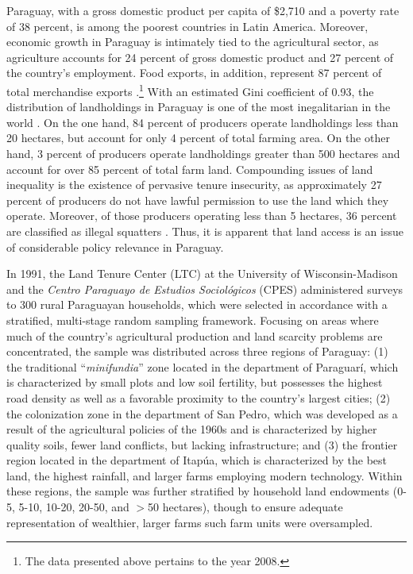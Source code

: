 \documentclass[english]{article}
\begin{document}
Paraguay, with a gross domestic product per capita of \$2,710 and a poverty rate of 38 percent, is among the poorest countries in Latin America. Moreover, economic growth in Paraguay is intimately tied to the agricultural sector, as agriculture accounts for 24 percent of gross domestic product and 27 percent of the country's employment. Food exports, in addition, represent 87 percent of total merchandise exports \citep{wdi2012}.\footnote{The data presented above pertains to the year 2008.} With an estimated Gini coefficient of 0.93, the distribution of landholdings in Paraguay is one of the most inegalitarian in the world \citep{lipton2009}. On the one hand, 84 percent of producers operate landholdings less than 20 hectares, but account for only 4 percent of total farming area.  On the other hand, 3 percent of producers operate landholdings greater than 500 hectares and account for over 85 percent of total farm land. Compounding issues of land inequality is the existence of pervasive tenure insecurity, as approximately 27 percent of producers do not have lawful permission to use the land which they operate. Moreover, of those producers operating less than 5 hectares, 36 percent are classified as illegal squatters \citep{mag2012}. Thus, it is apparent that land access is an issue of considerable policy relevance in Paraguay.

In 1991, the Land Tenure Center (LTC) at the University of Wisconsin-Madison and the \emph{Centro Paraguayo de Estudios Sociol\'{o}gicos} (CPES) administered surveys to 300 rural Paraguayan households, which were selected in accordance with a stratified, multi-stage random sampling framework. Focusing on areas where much of the country's agricultural production and land scarcity problems are concentrated, the sample was distributed across three regions of Paraguay: (1) the traditional ``\emph{minifundia}'' zone located in the department of Paraguar\'{i}, which is characterized by small plots and low soil fertility, but possesses the highest road density as well as a favorable proximity to the country's largest cities; (2) the colonization zone in the department of San Pedro, which was developed as a result of the agricultural policies of the 1960s and is characterized by higher quality soils, fewer land conflicts, but lacking infrastructure; and (3) the frontier region located in the department of Itap\'{u}a, which is characterized by the best land, the highest rainfall, and larger farms employing modern technology. Within these regions, the sample was further stratified by household land endowments (0-5, 5-10, 10-20, 20-50, and $>$50 hectares), though to ensure adequate representation of wealthier, larger farms such farm units were oversampled. 
\end{document}

